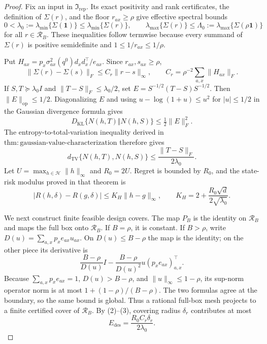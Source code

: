 \documentclass{article}
\begin{document}
\begin{proof}
Fix an input in \(\mathfrak I_{\mathrm{rep}}\).  Its exact positivity and rank certificates, the definition of \(\Sigma(r)\), and the floor \(r_{ax}\geq\rho\) give effective spectral bounds
\[
 0<\lambda_0:=\lambda_{\min}\{\Sigma(\mathbf1)\}
 \leq\lambda_{\min}\{\Sigma(r)\},\qquad
 \lambda_{\max}\{\Sigma(r)\}\leq
 \Lambda_0:=\lambda_{\max}\{\Sigma(\rho\mathbf1)\}                \tag{1}
\]
for all \(r\in\mathcal R_B\).  These inequalities follow termwise because every summand of \(\Sigma(r)\) is positive semidefinite and \(1\leq1/r_{ax}\leq1/\rho\).

Put \(H_{ax}=p_x\sigma^2_{ax}(q^0)d_xd_x^\top/e_{ax}\).  Since \(r_{ax},s_{ax}\geq\rho\),
\[
 \lVert\Sigma(r)-\Sigma(s)\rVert_F
 \leq C_r\lVert r-s\rVert_\infty,\qquad
 C_r=\rho^{-2}\sum_{a,x}\lVert H_{ax}\rVert_F.                     \tag{2}
\]
If \(S,T\succeq\lambda_0I\) and \(\lVert T-S\rVert_F\leq\lambda_0/2\), set \(E=S^{-1/2}(T-S)S^{-1/2}\).  Then \(\lVert E\rVert_{\mathrm{op}}\leq1/2\).  Diagonalizing \(E\) and using \(u-\log(1+u)\leq u^2\) for \(|u|\leq1/2\) in the Gaussian divergence formula gives
\[
 D_{\mathrm{KL}}\{N(h,T)\Vert N(h,S)\}\leq\tfrac12\lVert E\rVert_F^2.
\]
The entropy-to-total-variation inequality derived in \(\mathrm{thm:gaussian\text{-}value\text{-}characterization}\) therefore gives
\[
 d_{\mathrm{TV}}\{N(h,T),N(h,S)\}
 \leq\frac{\lVert T-S\rVert_F}{2\lambda_0}.                         \tag{3}
\]
Let \(U=\max_{h\in\mathcal H}\lVert h\rVert_\infty\) and \(R_0=2U\).  Regret is bounded by \(R_0\), and the state-risk modulus proved in that theorem is
\[
 |R(h,\delta)-R(g,\delta)|\leq K_H\lVert h-g\rVert_\infty,\qquad
 K_H=2+\frac{R_0\sqrt d}{2\sqrt{\lambda_0}}.                        \tag{4}
\]

We next construct finite feasible design covers.  The map \(P_B\) is the identity on \(\mathcal R_B\) and maps the full box onto \(\mathcal R_B\).  If \(B=\rho\), it is constant.  If \(B>\rho\), write \(D(u)=\sum_{a,x}p_xe_{ax}u_{ax}\).  On \(D(u)\leq B-\rho\) the map is the identity; on the other piece its derivative is
\[
 \frac{B-\rho}{D(u)}I-
 \frac{B-\rho}{D(u)^2}u(p_xe_{ax})_{a,x}^{\top}.
\]
Because \(\sum_{a,x}p_xe_{ax}=1\), \(D(u)>B-\rho\), and \(\lVert u\rVert_\infty\leq1-\rho\), its sup-norm operator norm is at most \(1+(1-\rho)/(B-\rho)\).  The two formulas agree at the boundary, so the same bound is global.  Thus a rational full-box mesh projects to a finite certified cover of \(\mathcal R_B\).  By (2)--(3), covering radius \(\delta_r\) contributes at most
\[
 E_{\mathrm{des}}=\frac{R_0C_r\delta_r}{2\lambda_0}.                 \tag{5}
\]


\end{proof}
\end{document}
